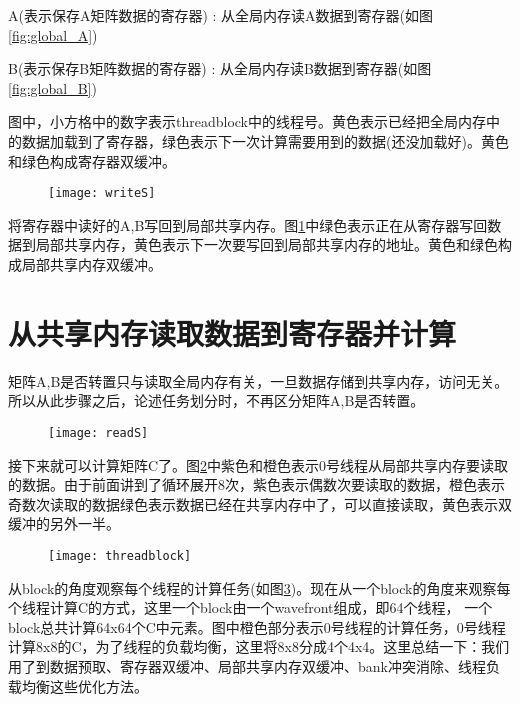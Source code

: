 A(表示保存A矩阵数据的寄存器) : 从全局内存读A数据到寄存器(如图\ref{fig:global_A})

B(表示保存B矩阵数据的寄存器) : 从全局内存读B数据到寄存器(如图\ref{fig:global_B})

图中，小方格中的数字表示threadblock中的线程号。黄色表示已经把全局内存中的数据加载到了寄存器，绿色表示下一次计算需要用到的数据(还没加载好)。黄色和绿色构成寄存器双缓冲。

\begin{figure}[htbp]
	\centering
	\texttt{[image: writeS]}
	\label{fig:writeS}
\end{figure}

将寄存器中读好的A,B写回到局部共享内存。图\ref{fig:writeS}中绿色表示正在从寄存器写回数据到局部共享内存，黄色表示下一次要写回到局部共享内存的地址。黄色和绿色构成局部共享内存双缓冲。


\section{从共享内存读取数据到寄存器并计算}
矩阵A,B是否转置只与读取全局内存有关，一旦数据存储到共享内存，访问无关。所以从此步骤之后，论述任务划分时，不再区分矩阵A,B是否转置。
\begin{figure}[htbp]
	\centering
	\texttt{[image: readS]}
	\label{fig:readS}
\end{figure}

接下来就可以计算矩阵C了。图\ref{fig:readS}中紫色和橙色表示0号线程从局部共享内存要读取的数据。由于前面讲到了循环展开8次，紫色表示偶数次要读取的数据，橙色表示奇数次读取的数据绿色表示数据已经在共享内存中了，可以直接读取，黄色表示双缓冲的另外一半。

\begin{figure}[htbp]
	\centering
	\texttt{[image: threadblock]}
	\label{fig:threadblock}
\end{figure}

从block的角度观察每个线程的计算任务(如图\ref{fig:threadblock})。现在从一个block的角度来观察每个线程计算C的方式，这里一个block由一个wavefront组成，即64个线程， 一个block总共计算64x64个C中元素。图中橙色部分表示0号线程的计算任务，0号线程计算8x8的C，为了线程的负载均衡，这里将8x8分成4个4x4。这里总结一下：我们用了到数据预取、寄存器双缓冲、局部共享内存双缓冲、bank冲突消除、线程负载均衡这些优化方法。


